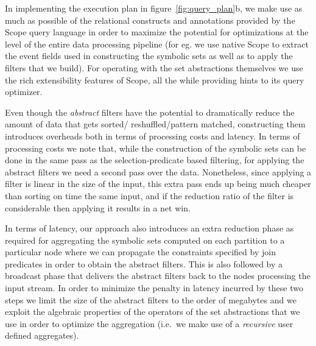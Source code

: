 In implementing the execution plan in figure~\ref{fig:query_plan}b,
we make use as much as possible of the relational constructs and annotations 
provided by the Scope query language in order to maximize the potential for 
optimizations at the level of the entire data processing pipeline (for eg. we 
use native Scope to extract the event fields used in constructing the symbolic 
sets as well as to apply the filters that we build).
For operating with the set abstractions themselves we use the rich 
extensibility features of Scope, all the while providing hints to its query 
optimizer.

Even though the {\em abstract} filters have the potential to dramatically 
reduce the amount of data that gets sorted\allowbreak /\allowbreak 
reshuffled\allowbreak /\allowbreak pattern matched, 
constructing them introduces overheads both in terms of processing costs and 
latency.
In terms of processing costs we note that, while the construction of the 
symbolic sets can be done in the same pass as the selection-predicate based 
filtering, for applying the abstract filters we need a second pass over the 
data.
Nonetheless, since applying a filter is linear in the size of the input, this 
extra pass ends up being much cheaper than sorting on time the same input, and 
if the reduction ratio of the filter is considerable then applying it results 
in a net win. 
   
In terms of latency, our approach also introduces an extra reduction phase as 
required for aggregating the symbolic sets computed on each partition to a 
particular node where we can propagate the constraints specified by join 
predicates in order to obtain the abstract filters.
This is also followed by a broadcast phase that delivers the abstract filters 
back to the nodes processing the input stream.
In order to minimize the penalty in latency incurred by these two steps we 
limit the size of the abstract filters to the order of megabytes and we exploit 
the algebraic properties of the operators of the set abstractions that we use 
in order to optimize the aggregation (i.e.\ we make use of a {\em recursive} 
user defined aggregates).





  
  
  
  